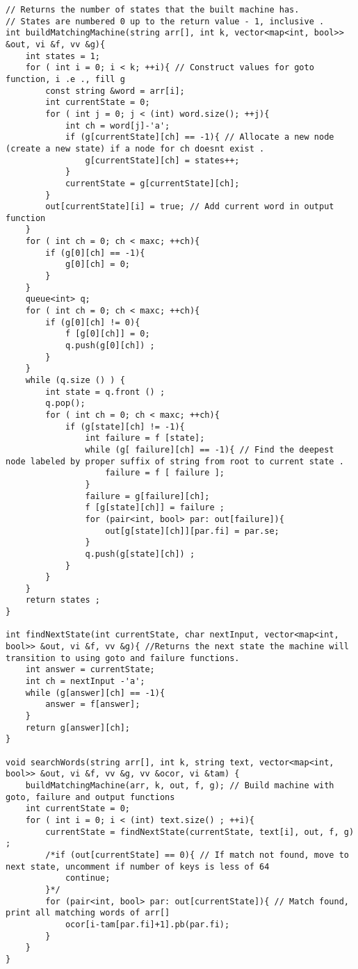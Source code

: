 \documentclass{article}
\begin{document}
\begin{multicols}{2}
\begin{lstlisting}
// Returns the number of states that the built machine has.
// States are numbered 0 up to the return value - 1, inclusive .
int buildMatchingMachine(string arr[], int k, vector<map<int, bool>> &out, vi &f, vv &g){
	int states = 1;
	for ( int i = 0; i < k; ++i){ // Construct values for goto function, i .e ., fill g
		const string &word = arr[i];
		int currentState = 0;
		for ( int j = 0; j < (int) word.size(); ++j){
			int ch = word[j]-'a';
			if (g[currentState][ch] == -1){ // Allocate a new node (create a new state) if a node for ch doesnt exist .
				g[currentState][ch] = states++;
			}
			currentState = g[currentState][ch];
		}
		out[currentState][i] = true; // Add current word in output function
	}
	for ( int ch = 0; ch < maxc; ++ch){
		if (g[0][ch] == -1){
			g[0][ch] = 0;
		}
	}
	queue<int> q;
	for ( int ch = 0; ch < maxc; ++ch){
		if (g[0][ch] != 0){
			f [g[0][ch]] = 0;
			q.push(g[0][ch]) ;
		}
	}
	while (q.size () ) {
		int state = q.front () ;
		q.pop();
		for ( int ch = 0; ch < maxc; ++ch){
			if (g[state][ch] != -1){
				int failure = f [state];
				while (g[ failure][ch] == -1){ // Find the deepest node labeled by proper suffix of string from root to current state .
					failure = f [ failure ];
				}
				failure = g[failure][ch];
				f [g[state][ch]] = failure ;
				for (pair<int, bool> par: out[failure]){
					out[g[state][ch]][par.fi] = par.se;
				}
				q.push(g[state][ch]) ;
			}
		}
	}
	return states ;
}

int findNextState(int currentState, char nextInput, vector<map<int, bool>> &out, vi &f, vv &g){ //Returns the next state the machine will transition to using goto and failure functions.
	int answer = currentState;
	int ch = nextInput -'a';
	while (g[answer][ch] == -1){
		answer = f[answer];
	}
	return g[answer][ch];
}

void searchWords(string arr[], int k, string text, vector<map<int, bool>> &out, vi &f, vv &g, vv &ocor, vi &tam) {
	buildMatchingMachine(arr, k, out, f, g); // Build machine with goto, failure and output functions
	int currentState = 0;
	for ( int i = 0; i < (int) text.size() ; ++i){
		currentState = findNextState(currentState, text[i], out, f, g) ;
		/*if (out[currentState] == 0){ // If match not found, move to next state, uncomment if number of keys is less of 64
			continue;
		}*/
		for (pair<int, bool> par: out[currentState]){ // Match found, print all matching words of arr[]
			ocor[i-tam[par.fi]+1].pb(par.fi);
		}
	}
}


\end{lstlisting}
\end{multicols}
\end{document}
